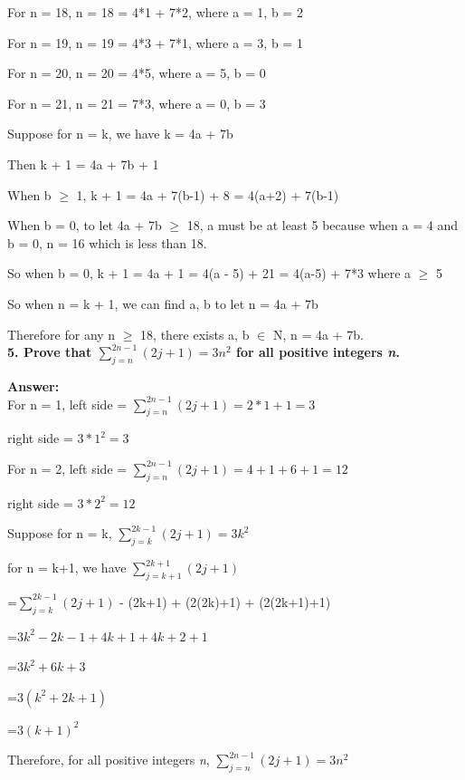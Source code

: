 \documentclass{article}
\begin{document}
\begin{large}
For n = 18, n = 18 = 4*1 + 7*2, where a = 1, b = 2

For n = 19, n = 19 = 4*3 + 7*1, where a = 3, b = 1

For n = 20, n = 20 = 4*5, where a = 5, b = 0

For n = 21, n = 21 = 7*3, where a = 0, b = 3

Suppose for n = k, we have k = 4a + 7b

Then k + 1 = 4a + 7b + 1

When b $\ge$ 1, k + 1 = 4a + 7(b-1) + 8 = 4(a+2) + 7(b-1)

When b = 0, to let 4a + 7b $\ge$ 18, a must be at least 5 because when a = 4 and b = 0, n = 16 which is less than 18.

So when b = 0, k + 1 = 4a + 1 = 4(a - 5) + 21 = 4(a-5) + 7*3 where a $\ge$ 5

So when n = k + 1, we can find a, b to let n = 4a + 7b

Therefore for any n $\ge$ 18, there exists a, b $\in$ N, n = 4a + 7b.\\


\textbf{5. Prove that $\sum\limits_{j=n}^{2n-1}(2j+1)=3n^{2}$ for all positive integers \emph{n}.}

\textbf{Answer:}\\


For n = 1, left side = $\sum\limits_{j=n}^{2n-1}(2j+1) = 2 * 1 + 1 = 3$

           right side = $3*1^2 = 3$
           
For n = 2, left side = $\sum\limits_{j=n}^{2n-1}(2j+1) = 4 + 1 + 6 + 1 = 12$

           right side = $3*2^2 = 12$
           
Suppose for n = k, $\sum\limits_{j=k}^{2k-1}(2j+1)=3k^{2}$

for n = k+1, we have $\sum\limits_{j=k+1}^{2k+1}(2j+1)$

                    =$\sum\limits_{j=k}^{2k-1}(2j+1)$ - (2k+1) + (2(2k)+1) + (2(2k+1)+1)
                    
                    =$3k^2 - 2k - 1 + 4k + 1 + 4k + 2 + 1$
                    
                    =$3k^2 + 6k + 3$
                    
                    =$3(k^2 + 2k + 1)$
                    
                    =$3(k+1)^2$
                    
Therefore, for all positive integers \emph{n}, $\sum\limits_{j=n}^{2n-1}(2j+1)=3n^{2}$\\


\end{large}
\end{document}
